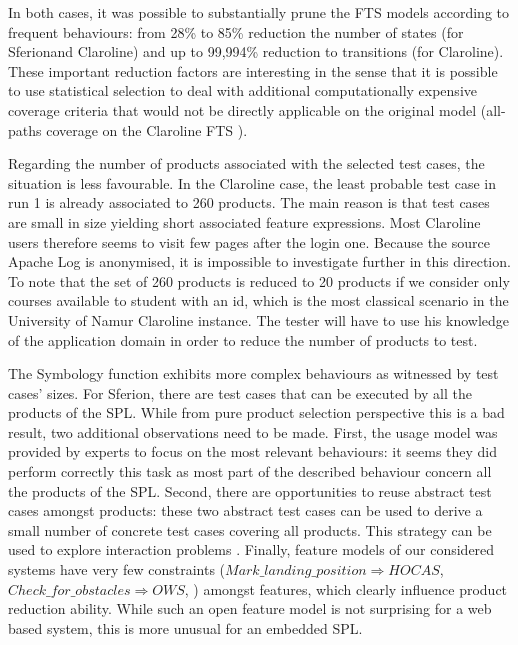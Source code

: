 In both cases, it was possible to substantially prune the FTS  models according to frequent behaviours: from 28\% to 85\% reduction \wrt the number of states (for Sferion\texttrademark and Claroline)  and up to 99,994\% reduction \wrt to transitions (for Claroline).  These important reduction factors are interesting in the sense that it is possible to use statistical selection to deal with additional computationally expensive coverage criteria that would not be directly applicable on the original model (\eg  all-paths coverage on the Claroline FTS \cite{Devroey2014c}). 

Regarding the number of products associated with the selected test cases, the situation is less favourable.  In the Claroline case, the least probable test case in run 1 is already associated to 260 products. The main reason is that test cases are small in size yielding short associated feature expressions. Most Claroline users therefore seems to visit few pages after the login one. Because the source Apache Log is anonymised, it is impossible to investigate further in this direction. To note that the set of 260 products is reduced to 20 products if we consider only courses available to student with an id, which is the most classical scenario in the University of Namur Claroline instance. The tester will have to use his knowledge of the application domain in order to reduce the number of products to test. 

The Symbology function exhibits more complex behaviours as witnessed by test cases' sizes.  For Sferion\texttrademark, there are test cases that can be executed by all the products of the SPL. While from pure product selection perspective this is a bad result, two additional observations need to be made. First,  the usage model was provided by experts to focus on the most relevant behaviours: it seems they did perform correctly this task as most part of the described behaviour concern all the products of the SPL. Second, there are opportunities to reuse abstract test cases amongst products: these two abstract test cases can be used to derive a small number of concrete test cases covering all products. This strategy can be used to explore interaction problems \cite{Nguyen2014}. Finally, feature models of our considered systems have very few constraints (\eg $Mark\_landing\_position \Rightarrow HOCAS$, $Check\_for\_obstacles \Rightarrow OWS$, \etc) amongst features, which clearly influence product reduction ability. While such  an open feature model is not surprising for a web based system, this is more unusual for an embedded SPL.                 

